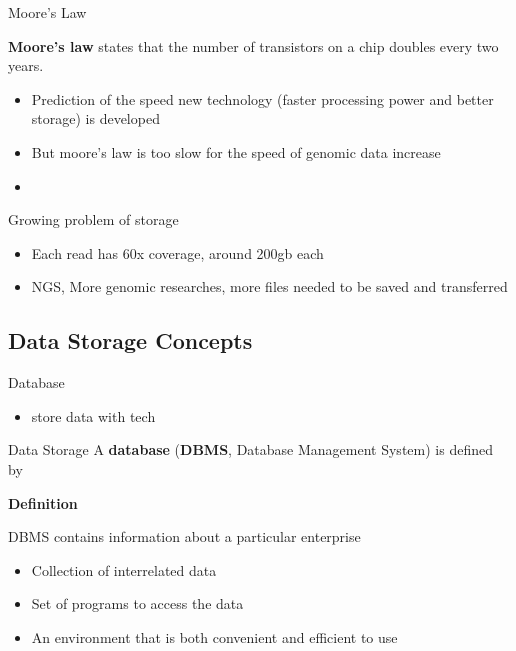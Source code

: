 \documentclass{beamer}
\begin{document}
\begin{frame}{Moore's Law}
  \begin{block}{\textbf{Moore's law}} 
    states that the number of transistors on a chip doubles every two years.\cite{kurose}
  \end{block}
  \begin{itemize}   
    \item Prediction of the speed new technology (faster processing power and better storage) is developed
    \item But moore's law is too slow for the speed of genomic data increase
    \item
  \end{itemize}
\end{frame}

\begin{frame}{Growing problem of storage}
  \begin{itemize}   
    \item Each read\cite{seqtorr} has 60x coverage, around 200gb each
    \item NGS, More genomic researches, more files needed to be saved and transferred
  \end{itemize}
\end{frame}

\subsection{Data Storage Concepts}
\begin{frame}{Database}
  \begin{itemize}   
    \item store data with tech
  \end{itemize}
\end{frame}
  \begin{frame}{Data Storage}
        A \textbf{database} (\textbf{DBMS}, Database Management System) is defined by 
        \begin{block} {\textbf{Definition}}

        DBMS contains information about a particular enterprise
        \begin{itemize}
            \item Collection of interrelated data
            \item Set of programs to access the data 
            \item An environment that is both convenient and efficient to use
        \end{itemize}
        \cite{Silberschatz2010}
        \end{block}
    \end{frame}
    
\end{document}

